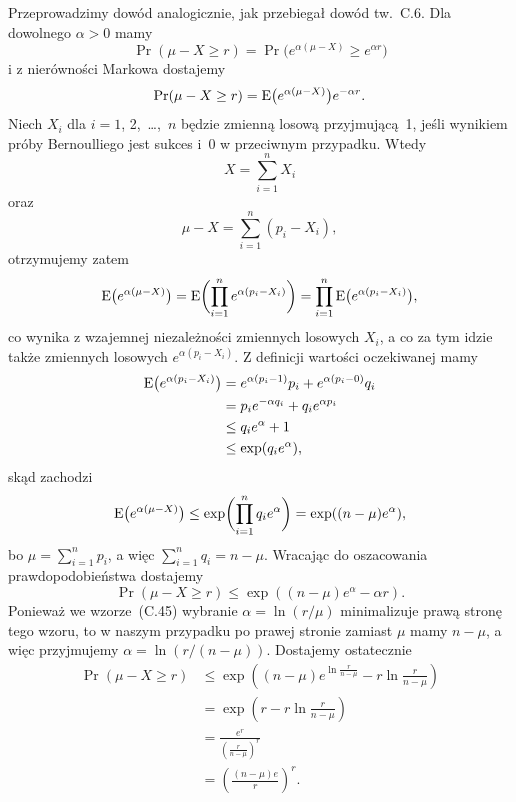 \exercise{} %
\noindent Przeprowadzimy dowód analogicznie, jak przebiegał dowód tw.~C.6. Dla dowolnego $\alpha>0$ mamy
\[
	\Pr(\mu-X\ge r) = \Pr\bigl(e^{\alpha(\mu-X)}\ge e^{\alpha r}\bigr)
\]
i z nierówności Markowa dostajemy
\[
	\Pr(\mu-X\ge r) = \operatorname{E}\bigl(e^{\alpha(\mu-X)}\bigr)e^{-\alpha r}.
\]
Niech $X_i$ dla $i=1$, 2,~\dots,~$n$ będzie zmienną losową przyjmującą~1, jeśli wynikiem  próby Bernoulliego jest sukces i~0 w przeciwnym przypadku. Wtedy
\[
	X = \sum_{i=1}^nX_i
\]
oraz
\[
	\mu-X = \sum_{i=1}^n(p_i-X_i),
\]
otrzymujemy zatem
\[
	\operatorname{E}\bigl(e^{\alpha(\mu-X)}\bigr) = \operatorname{E}\biggl(\prod_{i=1}^ne^{\alpha(p_i-X_i)}\biggr) = \prod_{i=1}^n\operatorname{E}\bigl(e^{\alpha(p_i-X_i)}\bigr),
\]
co wynika z wzajemnej niezależności zmiennych losowych $X_i$, a co za tym idzie także zmiennych losowych $e^{\alpha(p_i-X_i)}$. Z definicji wartości oczekiwanej mamy
\begin{align*}
	\operatorname{E}\bigl(e^{\alpha(p_i-X_i)}\bigr) &= e^{\alpha(p_i-1)}p_i+e^{\alpha(p_i-0)}q_i \\
	&= p_ie^{-\alpha q_i}+q_ie^{\alpha p_i} \\
	&\le q_ie^{\alpha}+1 \\
	&\le \exp(q_ie^\alpha),
\end{align*}
skąd zachodzi
\[
	\operatorname{E}\bigl(e^{\alpha(\mu-X)}\bigr) \le \exp\biggl(\prod_{i=1}^nq_ie^\alpha\biggr) = \exp((n-\mu)e^\alpha),
\]
bo $\mu=\sum_{i=1}^np_i$, a więc $\sum_{i=1}^nq_i=n-\mu$. Wracając do oszacowania prawdopodobieństwa dostajemy
\[
	\Pr(\mu-X\ge r) \le \exp((n-\mu)e^\alpha-\alpha r).
\]
Ponieważ we wzorze~(C.45) wybranie $\alpha=\ln(r/\mu)$ minimalizuje prawą stronę tego wzoru, to w naszym przypadku po prawej stronie zamiast $\mu$ mamy $n-\mu$, a więc przyjmujemy $\alpha=\ln(r/(n-\mu))$. Dostajemy ostatecznie
\begin{align*}
	\Pr(\mu-X\ge r) &\le \exp\left((n-\mu)e^{\ln\frac{r}{n-\mu}}-r\ln\frac{r}{n-\mu}\right) \\
	&= \exp\left(r-r\ln\frac{r}{n-\mu}\right) \\
	&= \frac{e^r}{\left(\frac{r}{n-\mu}\right)^r} \\
	&= \left(\frac{(n-\mu)e}{r}\right)^r.
\end{align*}

\exercise{} %
\bigskip


